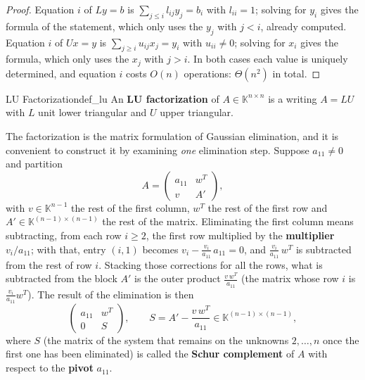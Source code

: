 \documentclass[11pt, a4paper]{article}
\begin{document}
\begin{proof}
Equation $i$ of $Ly = b$ is $\sum_{j \le i} l_{ij} y_j = b_i$ with $l_{ii} = 1$; solving for $y_i$ gives the formula of the statement, which only uses the $y_j$ with $j < i$, already computed. Equation $i$ of $Ux = y$ is $\sum_{j \ge i} u_{ij} x_j = y_i$ with $u_{ii} \neq 0$; solving for $x_i$ gives the formula, which only uses the $x_j$ with $j > i$. In both cases each value is uniquely determined, and equation $i$ costs $O(n)$ operations: $\Theta(n^2)$ in total.
\end{proof}

\begin{definicion}{LU Factorization}{def_lu}
An \textbf{LU factorization} of $A \in \mathbb{K}^{n \times n}$ is a writing $A = LU$ with $L$ unit lower triangular and $U$ upper triangular.
\end{definicion}

The factorization is the matrix formulation of Gaussian elimination, and it is convenient to construct it by examining \emph{one} elimination step. Suppose $a_{11} \neq 0$ and partition
\[
A = \begin{pmatrix} a_{11} & w^T \\ v & A' \end{pmatrix},
\]
with $v \in \mathbb{K}^{n-1}$ the rest of the first column, $w^T$ the rest of the first row and $A' \in \mathbb{K}^{(n-1) \times (n-1)}$ the rest of the matrix. Eliminating the first column means subtracting, from each row $i \ge 2$, the first row multiplied by the \textbf{multiplier} $v_i / a_{11}$; with that, entry $(i,1)$ becomes $v_i - \frac{v_i}{a_{11}} \, a_{11} = 0$, and $\frac{v_i}{a_{11}} \, w^T$ is subtracted from the rest of row $i$. Stacking those corrections for all the rows, what is subtracted from the block $A'$ is the outer product $\frac{v \, w^T}{a_{11}}$ (the matrix whose row $i$ is $\frac{v_i}{a_{11}} w^T$). The result of the elimination is then
\[
\begin{pmatrix} a_{11} & w^T \\ 0 & S \end{pmatrix},
\qquad S = A' - \frac{v \, w^T}{a_{11}} \in \mathbb{K}^{(n-1) \times (n-1)},
\]
where $S$ (the matrix of the system that remains on the unknowns $2, \dots, n$ once the first one has been eliminated) is called the \textbf{Schur complement} of $A$ with respect to the \textbf{pivot} $a_{11}$.
\end{document}

